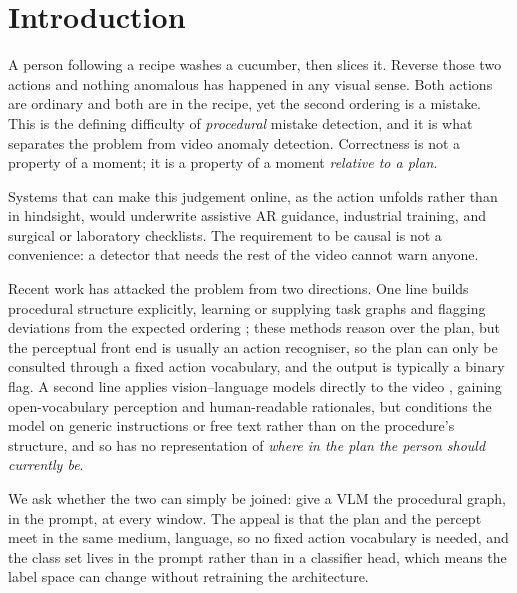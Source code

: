 \documentclass[10pt,twocolumn]{article}
\begin{document}
\section{Introduction}

A person following a recipe washes a cucumber, then slices it. Reverse those two
actions and nothing anomalous has happened in any visual sense. Both actions
are ordinary and both are in the recipe, yet the second ordering is a mistake.
This is the defining difficulty of \emph{procedural} mistake detection, and it
is what separates the problem from video anomaly detection. Correctness is not a
property of a moment; it is a property of a moment \emph{relative to a plan}.

Systems that can make this judgement online, as the action unfolds rather than
in hindsight, would underwrite assistive AR guidance, industrial training, and
surgical or laboratory checklists. The requirement to be causal is not a
convenience: a detector that needs the rest of the video cannot warn anyone.

Recent work has attacked the problem from two directions. One line builds
procedural structure explicitly, learning or supplying task graphs and flagging
deviations from the expected ordering
\citep{flaborea2024prego,seminara2024taskgraph,lee2024egoper}; these methods
reason over the plan, but the perceptual front end is usually an action
recogniser, so the plan can only be consulted through a fixed action vocabulary,
and the output is typically a binary flag. A second line applies vision--language
models directly to the video \citep{storks2025transparent,spurio2026posttraining},
gaining open-vocabulary perception and human-readable rationales, but conditions
the model on generic instructions or free text rather than on the procedure's
structure, and so has no representation of \emph{where in the plan the person
should currently be}.

We ask whether the two can simply be joined: give a VLM the procedural graph, in
the prompt, at every window. The appeal is that the plan and the percept meet in
the same medium, language, so no fixed action vocabulary is needed, and the
class set lives in the prompt rather than in a classifier head, which means the
label space can change without retraining the architecture.
\end{document}
